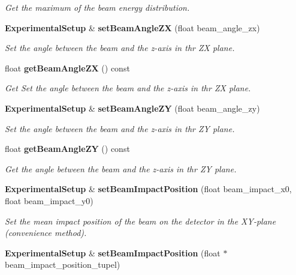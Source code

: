\begin{DoxyCompactItemize}
\begin{DoxyCompactList}\small\item\em Get the maximum of the beam energy distribution. \item\end{DoxyCompactList}\item 
{\bf ExperimentalSetup} \& {\bf setBeamAngleZX} (float beam\_\-angle\_\-zx)\label{classCALICE_1_1ExperimentalSetup_a560946155aed8298f1e27d898674928f}

\begin{DoxyCompactList}\small\item\em Set the angle between the beam and the z-\/axis in thr ZX plane. \item\end{DoxyCompactList}\item 
float {\bf getBeamAngleZX} () const \label{classCALICE_1_1ExperimentalSetup_a135bccef5d9b62b3b30f031eb0c55a3b}

\begin{DoxyCompactList}\small\item\em Get Set the angle between the beam and the z-\/axis in thr ZX plane. \item\end{DoxyCompactList}\item 
{\bf ExperimentalSetup} \& {\bf setBeamAngleZY} (float beam\_\-angle\_\-zy)\label{classCALICE_1_1ExperimentalSetup_ad64841d5c4e5f36fae1e2be1f6bf2c37}

\begin{DoxyCompactList}\small\item\em Set the angle between the beam and the z-\/axis in thr ZY plane. \item\end{DoxyCompactList}\item 
float {\bf getBeamAngleZY} () const \label{classCALICE_1_1ExperimentalSetup_ad4b57b1e659c5a205c681406e6504992}

\begin{DoxyCompactList}\small\item\em Get the angle between the beam and the z-\/axis in thr ZY plane. \item\end{DoxyCompactList}\item 
{\bf ExperimentalSetup} \& {\bf setBeamImpactPosition} (float beam\_\-impact\_\-x0, float beam\_\-impact\_\-y0)\label{classCALICE_1_1ExperimentalSetup_a2fe99a87c6c6f3dcb2bcf00fe50ac620}

\begin{DoxyCompactList}\small\item\em Set the mean impact position of the beam on the detector in the XY-\/plane (convenience method). \item\end{DoxyCompactList}\item 
{\bf ExperimentalSetup} \& {\bf setBeamImpactPosition} (float $\ast$beam\_\-impact\_\-position\_\-tupel)\label{classCALICE_1_1ExperimentalSetup_af81b450d886c0e9857555fb1a9e9222a}


\end{DoxyCompactItemize}

